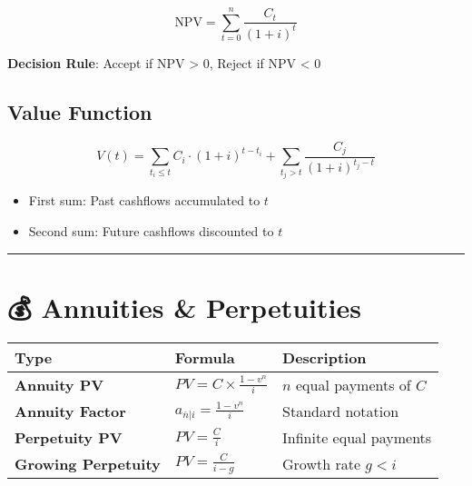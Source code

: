 \documentclass[
  letterpaper,
]{scrbook}
\providecommand{\tightlist}{%
  \setlength{\itemsep}{0pt}\setlength{\parskip}{0pt}}
\begin{document}
\[
\text{NPV} = \sum_{t=0}^{n} \frac{C_t}{(1+i)^t}
\]

\textbf{Decision Rule}: Accept if NPV \textgreater{} 0, Reject if NPV
\textless{} 0

\subsection*{Value Function}\label{value-function-1}

\[
V(t) = \sum_{t_i \leq t} C_i \cdot (1+i)^{t-t_i} + \sum_{t_j > t} \frac{C_j}{(1+i)^{t_j - t}}
\]

\begin{itemize}
\tightlist
\item
  First sum: Past cashflows accumulated to \(t\)
\item
  Second sum: Future cashflows discounted to \(t\)
\end{itemize}

\begin{center}\rule{0.5\linewidth}{0.5pt}\end{center}

\section*{💰 Annuities \& Perpetuities}\label{annuities-perpetuities}


\begin{longtable}[]{@{}
  >{\raggedright\arraybackslash}p{}
  >{\raggedright\arraybackslash}p{}
  >{\raggedright\arraybackslash}p{}@{}}
\toprule\noalign{}
\begin{minipage}[b]{\linewidth}\raggedright
Type
\end{minipage} & \begin{minipage}[b]{\linewidth}\raggedright
Formula
\end{minipage} & \begin{minipage}[b]{\linewidth}\raggedright
Description
\end{minipage} \\
\midrule\noalign{}
\endhead
\bottomrule\noalign{}
\endlastfoot
\textbf{Annuity PV} & \(PV = C \times \frac{1 - v^n}{i}\) & \(n\) equal
payments of \(C\) \\
\textbf{Annuity Factor} & \(a_{\overline{n}|i} = \frac{1 - v^n}{i}\) &
Standard notation \\
\textbf{Perpetuity PV} & \(PV = \frac{C}{i}\) & Infinite equal
payments \\
\textbf{Growing Perpetuity} & \(PV = \frac{C}{i - g}\) & Growth rate
\(g < i\) \\
\end{longtable}
\end{document}
